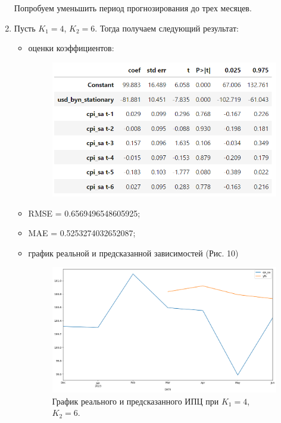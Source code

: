 \documentclass[a4paper, 12pt]{extarticle}
\begin{document}
\begin{enumerate}
			Попробуем уменьшить период прогнозирования до трех месяцев.
			
			\item Пусть $K_1 = 4$, $K_2 = 6$. Тогда получаем следующий результат:
			\begin{itemize}
				\item оценки коэффициентов:
				\begin{figure}[h!]
					\centering
					\includegraphics[scale=1.1]{images/tab_6}
					\label{fig:tab6}
				\end{figure}
				
				\item RMSE = 0.6569496548605925;
				\item MAE = 0.5253274032652087;
				\item график реальной и предсказанной зависимостей (Рис. 10)
				\begin{figure}[h!]
					\centering
					\includegraphics[scale=0.4]{images/pic_10}
					\caption[Рис. 10]{График реального и предсказанного ИПЦ при $K_1 = 4$, $K_2 = 6$.}
					\label{fig:pic10}
				\end{figure}
				

\end{itemize}
\end{enumerate}
\end{document}
